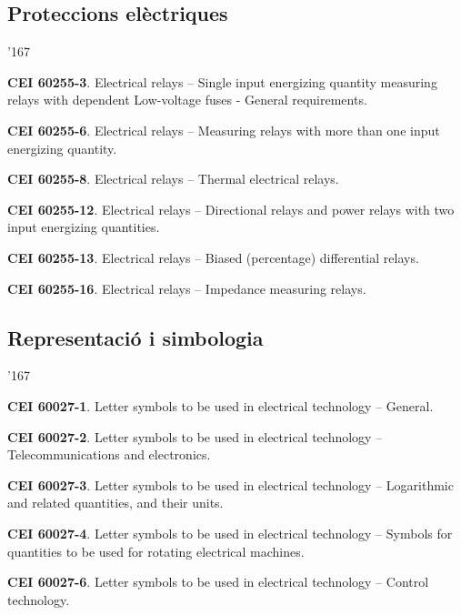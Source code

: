 \subsection*{Proteccions el\`{e}ctriques}
\begin{dinglist}{'167}
    \item \textbf{CEI 60255-3}. Electrical relays -- Single input energizing quantity measuring relays with dependent Low-voltage fuses - General requirements.
    \item \textbf{CEI 60255-6}. Electrical relays -- Measuring relays with more than one input energizing quantity.
    \item \textbf{CEI 60255-8}. Electrical relays -- Thermal electrical relays.
    \item \textbf{CEI 60255-12}. Electrical relays -- Directional relays and power relays with two input energizing quantities.
    \item \textbf{CEI 60255-13}. Electrical relays -- Biased (percentage) differential relays.
    \item \textbf{CEI 60255-16}. Electrical relays -- Impedance measuring relays.
\end{dinglist}

\subsection*{Representaci\'{o} i simbologia}
\begin{dinglist}{'167}
    \item \textbf{CEI 60027-1}. Letter symbols to be used in electrical technology -- General.
    \item \textbf{CEI 60027-2}. Letter symbols to be used in electrical technology -- Telecommunications and electronics.
    \item \textbf{CEI 60027-3}. Letter symbols to be used in electrical technology -- Logarithmic and related quantities, and their units.
    \item \textbf{CEI 60027-4}. Letter symbols to be used in electrical technology -- Symbols for quantities to be used for rotating electrical machines.
    \item \textbf{CEI 60027-6}. Letter symbols to be used in electrical technology -- Control technology.
\end{dinglist}


